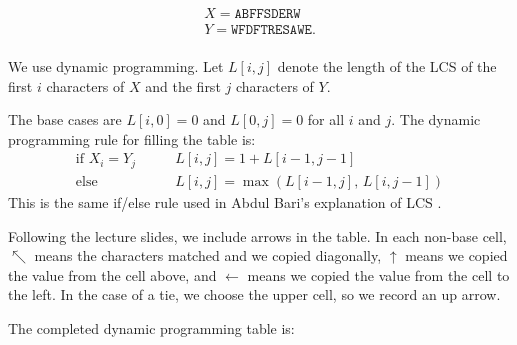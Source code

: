 \documentclass{brockcosc3p03}
\begin{document}
\begin{gather*}
    X = \texttt{ABFFSDERW}\\
    Y = \texttt{WFDFTRESAWE}.\\
\end{gather*}

We use dynamic programming. Let $L[i,j]$ denote the length of the LCS of the first $i$ characters of $X$ and the first $j$ characters of $Y$.

The base cases are $L[i,0]=0$ and $L[0,j]=0$ for all $i$ and $j$. The dynamic programming rule for filling the table is:
\[
\begin{aligned}
\text{if } X_i = Y_j \qquad & L[i,j] = 1 + L[i-1,j-1] \\
\text{else} \qquad & L[i,j] = \max(L[i-1,j],\,L[i,j-1])
\end{aligned}
\]
This is the same if/else rule used in Abdul Bari's explanation of LCS \cite{bari_lcs}.

Following the lecture slides, we include arrows in the table. In each non-base cell, $\nwarrow$ means the characters matched and we copied diagonally, $\uparrow$ means we copied the value from the cell above, and $\leftarrow$ means we copied the value from the cell to the left. In the case of a tie, we choose the upper cell, so we record an up arrow.

The completed dynamic programming table is:
\end{document}
